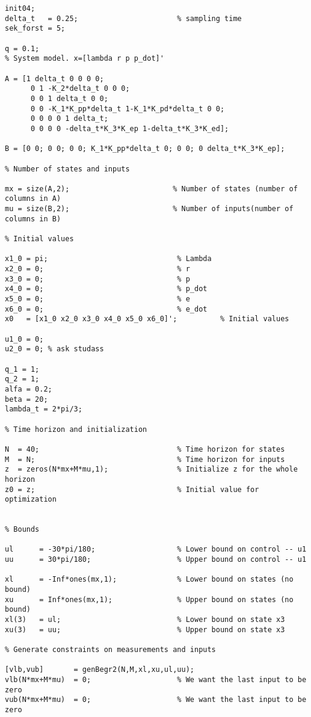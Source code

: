 \begin{lstlisting}
init04;
delta_t	  = 0.25;	                    % sampling time
sek_forst = 5;

q = 0.1;
% System model. x=[lambda r p p_dot]'

A = [1 delta_t 0 0 0 0;
      0 1 -K_2*delta_t 0 0 0;
      0 0 1 delta_t 0 0;
      0 0 -K_1*K_pp*delta_t 1-K_1*K_pd*delta_t 0 0;
      0 0 0 0 1 delta_t;
      0 0 0 0 -delta_t*K_3*K_ep 1-delta_t*K_3*K_ed];
  
B = [0 0; 0 0; 0 0; K_1*K_pp*delta_t 0; 0 0; 0 delta_t*K_3*K_ep];

% Number of states and inputs

mx = size(A,2);                        % Number of states (number of columns in A)
mu = size(B,2);                        % Number of inputs(number of columns in B)

% Initial values

x1_0 = pi;                              % Lambda
x2_0 = 0;                               % r
x3_0 = 0;                               % p
x4_0 = 0;                               % p_dot
x5_0 = 0;                               % e
x6_0 = 0;                               % e_dot
x0   = [x1_0 x2_0 x3_0 x4_0 x5_0 x6_0]';          % Initial values

u1_0 = 0;
u2_0 = 0; % ask studass

q_1 = 1;
q_2 = 1;
alfa = 0.2;
beta = 20;
lambda_t = 2*pi/3;

% Time horizon and initialization

N  = 40;                                % Time horizon for states
M  = N;                                 % Time horizon for inputs
z  = zeros(N*mx+M*mu,1);                % Initialize z for the whole horizon
z0 = z;                                 % Initial value for optimization


% Bounds

ul 	    = -30*pi/180;                   % Lower bound on control -- u1
uu 	    = 30*pi/180;                    % Upper bound on control -- u1

xl      = -Inf*ones(mx,1);              % Lower bound on states (no bound)
xu      = Inf*ones(mx,1);               % Upper bound on states (no bound)
xl(3)   = ul;                           % Lower bound on state x3
xu(3)   = uu;                           % Upper bound on state x3

% Generate constraints on measurements and inputs

[vlb,vub]       = genBegr2(N,M,xl,xu,ul,uu);
vlb(N*mx+M*mu)  = 0;                    % We want the last input to be zero
vub(N*mx+M*mu)  = 0;                    % We want the last input to be zero


\end{lstlisting}
